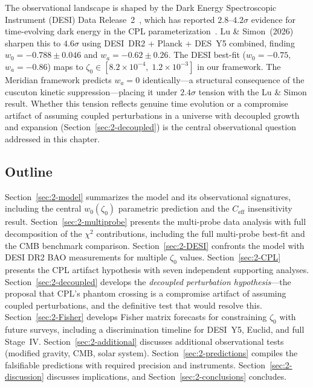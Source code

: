 The observational landscape is shaped by the Dark Energy Spectroscopic Instrument (DESI) Data Release~2~\cite{ch2:DESIDR2}, which has reported $2.8$--$4.2\sigma$ evidence for time-evolving dark energy in the CPL parameterization~\cite{ch2:Chevallier2001,ch2:Linder2003}. Lu \& Simon~(2026)~\cite{ch2:LuSimon2026} sharpen this to $4.6\sigma$ using DESI~DR2 + Planck + DES~Y5 combined, finding $w_0 = -0.788 \pm 0.046$ and $w_a = -0.62 \pm 0.26$. The DESI best-fit ($w_0 = -0.75$, $w_a = -0.86$) maps to $\zeta_0 \in [8.2 \times 10^{-4},\; 1.2 \times 10^{-3}]$ in our framework. The Meridian framework predicts $w_a = 0$ identically---a structural consequence of the cuscuton kinetic suppression---placing it under $2.4\sigma$ tension with the Lu \& Simon result. Whether this tension reflects genuine time evolution or a compromise artifact of assuming coupled perturbations in a universe with decoupled growth and expansion (Section~\ref{sec:2-decoupled}) is the central observational question addressed in this chapter.

\subsection{Outline}
\label{sec:2-outline}

Section~\ref{sec:2-model} summarizes the model and its observational signatures, including the central $w_0(\zeta_0)$ parametric prediction and the $C_\mathrm{eff}$ insensitivity result. Section~\ref{sec:2-multiprobe} presents the multi-probe data analysis with full decomposition of the $\chi^2$ contributions, including the full multi-probe best-fit and the CMB benchmark comparison. Section~\ref{sec:2-DESI} confronts the model with DESI DR2 BAO measurements for multiple $\zeta_0$ values. Section~\ref{sec:2-CPL} presents the CPL artifact hypothesis with seven independent supporting analyses. Section~\ref{sec:2-decoupled} develops the \emph{decoupled perturbation hypothesis}---the proposal that CPL's phantom crossing is a compromise artifact of assuming coupled perturbations, and the definitive test that would resolve this. Section~\ref{sec:2-Fisher} develops Fisher matrix forecasts for constraining $\zeta_0$ with future surveys, including a discrimination timeline for DESI~Y5, Euclid, and full Stage~IV. Section~\ref{sec:2-additional} discusses additional observational tests (modified gravity, CMB, solar system). Section~\ref{sec:2-predictions} compiles the falsifiable predictions with required precision and instruments. Section~\ref{sec:2-discussion} discusses implications, and Section~\ref{sec:2-conclusions} concludes.

